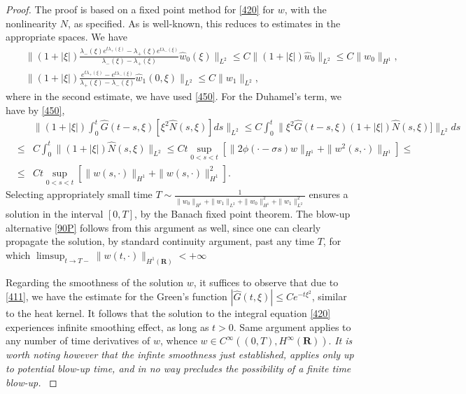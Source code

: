 \documentclass[12pt]{amsart}
\theoremstyle{definition}
\theoremstyle{remark}
\numberwithin{equation}{section}
\renewcommand{\(}{\left(}
\renewcommand{\)}{\right)}
\renewcommand{\[}{\left[}
\renewcommand{\]}{\right]}
\newcommand{\f}[2]{\frac{#1}{#2}}
\newcommand{\la}{\lambda}
\newcommand{\si}{\sigma}
\newcommand{\rone}{\mathbf R}
\begin{document}
\begin{proof}
	The proof is based on a fixed point method for \eqref{420} for $w$, with the nonlinearity $N$, as specified. As is well-known, this reduces to estimates in the appropriate spaces. We have 
	\begin{eqnarray*}
	& & 	\|(1+|\xi|) \f{\la_-(\xi) e^{t \la_+(\xi)}-\la_+(\xi) e^{t \la_-(\xi)}}{\la_-(\xi)-\la_+(\xi)}  \hat{w}_0(\xi)\|_{L^2}\leq C \|(1+|\xi|) \hat{w}_0\|_{L^2}\leq C \|w_0\|_{H^1}, \\
	& & \|(1+|\xi|)  \f{e^{t \la_+(\xi)}-e^{t \la_-(\xi)}}{\la_+(\xi)-\la_-(\xi)} \hat{w}_1 (0,\xi)\|_{L^2}\leq C\|w_1\|_{L^2},
	\end{eqnarray*}
where in the second estimate, we have used \eqref{450}. 
For the Duhamel's term, we have by \eqref{450}, 
\begin{eqnarray*}
	& &  \|(1+|\xi|)  \int_0^t \hat{G}(t-s, \xi) [\xi^2 \hat{N}(s, \xi)] ds\|_{L^2}\leq C \int_0^t \| \xi^2  \hat{G}(t-s, \xi)  (1+|\xi|) \hat{N}(s, \xi)]\|_{L^2} ds \\
	&\leq & C \int_0^t \|(1+|\xi|) \hat{N}(s, \xi)\|_{L^2}\leq C t \sup_{0<s<t} [\|2\phi(\cdot-\si s) w\|_{H^1}+\|w^2(s, \cdot)\|_{H^1}]\leq \\
	&\leq & C t \sup_{0<s<t} 
	[\|w(s, \cdot)\|_{H^1}+ \|w(s, \cdot)\|_{H^1}^2].
\end{eqnarray*}
Selecting appropriately  small time $T\sim \f{1}{\|w_0\|_{H^1}+\|w_1\|_{L^2}+\|w_0\|_{H^1}^2+\|w_1\|_{L^2}^2}$ ensures a solution in the interval $[0,T]$, by the Banach fixed point theorem. The blow-up alternative \eqref{90P} follows from this argument as well, since one can clearly propagate the solution, by standard continuity  argument, past any time $T$, for which $	\limsup_{t\to T-} \|w(t, \cdot)\|_{H^1(\rone)}<+\infty$

Regarding the smoothness of the solution $w$, it suffices to observe that due to \eqref{411}, we have the estimate for the Green's function $|\hat{G}(t, \xi)|\leq C e^{-t \xi^2}$, similar to the heat kernel. It follows that the solution to the integral equation \eqref{420} experiences infinite smoothing effect, as long as $t>0$. Same argument applies to any number of time derivatives of $w$, whence $w\in C^\infty((0,T), H^\infty(\rone))$. {\it It is worth noting however that the infinte smoothness just established, applies only up to potential  blow-up time, and  in no way precludes the possibility of a finite time blow-up. } 
\end{proof}
\end{document}
